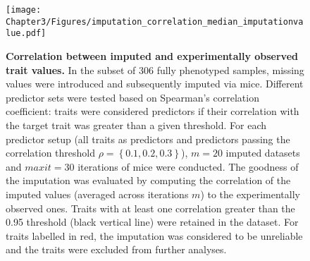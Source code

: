\begin{figure}[hbtp]
	\centering
	\texttt{[image: Chapter3/Figures/imputation\_correlation\_median\_imputationvalue.pdf]}
	\caption[\textbf{Correlation between imputed and experimentally observed trait values.}]{\textbf{Correlation between imputed and experimentally observed trait values.} In the subset of \num{306} fully phenotyped samples, missing values were introduced and subsequently imputed via \gls{mice}. Different predictor sets were tested based on Spearman's correlation coefficient: traits were considered predictors if their correlation with the target trait was greater than a given threshold. For each predictor setup (all traits as predictors and predictors passing the correlation threshold \(\rho =\left\{0.1, 0.2, 0.3\right\}\)), \(m=20\) imputed datasets and \(maxit=30\) iterations of \gls{mice} were conducted. The goodness of the imputation was evaluated by computing the correlation of the imputed values (averaged across iterations \(m\)) to the experimentally observed ones. Traits with at least one correlation greater than the \num{0.95} threshold (black vertical line) were retained in the dataset. For traits labelled in red, the imputation was considered to be unreliable and the traits were excluded from further analyses.}
 	\label{fig:mice}
\end{figure}


